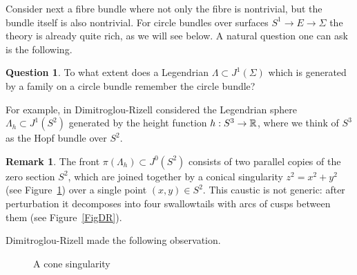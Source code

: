 \documentclass[11pt]{article}
\newcommand{\smaller}{\small}
\numberwithin{equation}{section}\providecommand{\dpl}{\displaystyle}
\theoremstyle{plain}
\theoremstyle{definition}
\newtheorem{remark}[theorem]{Remark}
\newtheorem{question}[theorem]{Question}
\begin{document}
Consider next a fibre bundle where not only the fibre is nontrivial, but the bundle itself is also nontrivial. For circle bundles over surfaces $S^1 \to E \to \Sigma$ the theory is already quite rich, as we will see below. A natural question one can ask is the following.
\begin{question}\label{Question: remember} To what extent does a Legendrian $\Lambda \subset J^1(\Sigma)$ which is generated by a family on a circle bundle remember the circle bundle?
\end{question}
For example, in \cite{DR11} Dimitroglou-Rizell considered the Legendrian sphere $\Lambda_h \subset J^1(S^2)$ generated by the height function $h:S^3 \to \mathbb{R}$, where we think of $S^3$ as the Hopf bundle over $S^2$. \begin{remark} The front $\pi(\Lambda_h)\!\subset\!J^0(S^2)$ consists of two parallel copies of the zero section $S^2$, which are joined together by a conical singularity $z^2\!=\!x^2+y^2$ (see Figure~\ref{Fig: cone}) over a single point $(x,y) \in S^2$. This caustic is not generic: after perturbation it decomposes into four swallowtails with arcs of cusps between them (see Figure~\ref{FigDR}).
\end{remark}
Dimitroglou-Rizell made the following observation.

\begin{figure}[htbp]
\begin{center}
\caption{\smaller A cone singularity}
\label{Fig: cone}
\end{center}
\end{figure}
\end{document}
